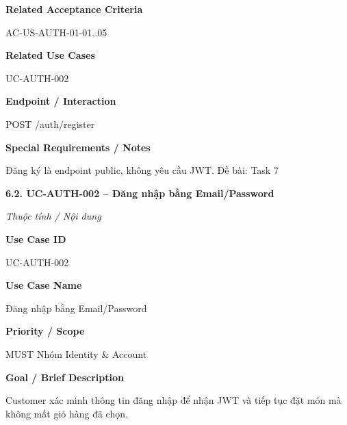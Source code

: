 \documentclass[11pt,a4paper,oneside]{report}
\begin{document}
\par\smallskip\noindent\textcolor{sgublue}{\textbf{Related Acceptance Criteria}}\par\nobreak
AC-US-AUTH-01-01..05
\par

\par\smallskip\noindent\textcolor{sgublue}{\textbf{Related Use Cases}}\par\nobreak
UC-AUTH-002
\par

\par\smallskip\noindent\textcolor{sgublue}{\textbf{Endpoint / Interaction}}\par\nobreak
POST /auth/register
\par

\par\smallskip\noindent\textcolor{sgublue}{\textbf{Special Requirements / Notes}}\par\nobreak
Đăng ký là endpoint public, không yêu cầu JWT. \textbar{} Đề bài: Task 7
\par



\textbf{6.2. UC-AUTH-002 -- Đăng nhập bằng Email/Password}



\par\noindent\textit{Thuộc tính / Nội dung}\par

\par\smallskip\noindent\textcolor{sgublue}{\textbf{Use Case ID}}\par\nobreak
UC-AUTH-002
\par

\par\smallskip\noindent\textcolor{sgublue}{\textbf{Use Case Name}}\par\nobreak
Đăng nhập bằng Email/Password
\par

\par\smallskip\noindent\textcolor{sgublue}{\textbf{Priority / Scope}}\par\nobreak
MUST \textbar{} Nhóm Identity \& Account
\par

\par\smallskip\noindent\textcolor{sgublue}{\textbf{Goal / Brief Description}}\par\nobreak
Customer xác minh thông tin đăng nhập để nhận JWT và tiếp tục đặt món mà không mất giỏ hàng đã chọn.
\par
\end{document}
